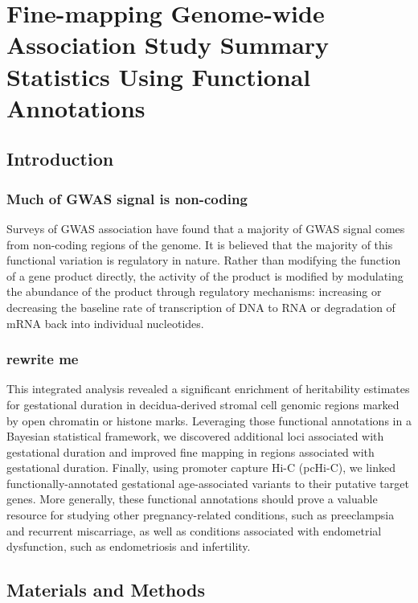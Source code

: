 \chapter{Fine-mapping Genome-wide Association Study Summary Statistics Using Functional Annotations}

\section{Introduction}\label{sec:org59556ac}


\subsection{Much of GWAS signal is non-coding}\label{sec:org3ac0b01}

Surveys of GWAS association have found that a majority of GWAS signal comes from non-coding regions of the genome.  It is believed that the majority 
of this functional variation is regulatory in nature.  Rather than modifying the function of a gene product directly, the activity of the product is modified
by modulating the abundance of the product through regulatory mechanisms: increasing or decreasing the baseline rate of transcription of DNA to RNA or degradation of mRNA back into individual nucleotides.  


\subsection{rewrite me}
This integrated analysis revealed a significant enrichment of heritability estimates for gestational duration in decidua-derived stromal cell genomic regions marked by open chromatin or histone marks. Leveraging those functional annotations in a Bayesian statistical framework, we discovered additional loci associated with gestational duration and improved fine mapping in regions associated with gestational duration. Finally, using promoter capture Hi-C (pcHi-C), we linked functionally-annotated gestational age-associated variants to their putative target genes. More generally, these functional annotations should prove a valuable resource for studying other pregnancy-related conditions, such as preeclampsia and recurrent miscarriage, as well as conditions associated with endometrial dysfunction, such as endometriosis and infertility. 

\section{Materials and Methods}\label{sec:org39326e2}

